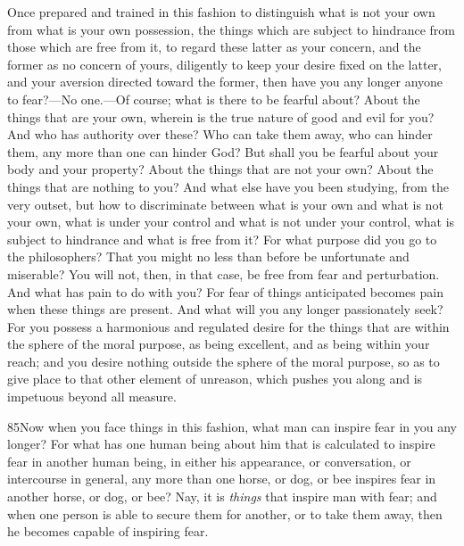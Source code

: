 Once prepared and trained in this fashion to distinguish what is not your own from what is your own possession, the things which are subject to hindrance from those which are free from it, to regard these latter as your concern, and the former as no concern of yours, diligently to keep your desire fixed on the latter, and your aversion directed toward the former, then have you any longer anyone to fear?—No one.—Of course; what is there to be fearful about? About the things that are your own, wherein is the true nature of good and evil for you? And who has authority over these? Who can take them away, who can hinder them, any more than one can hinder God? But shall you be fearful about your body and your property? About the things that are not your own? About the things that are nothing to you? And what else have you been studying, from the very outset, but how to discriminate between what is your own and what is not your own, what is under your control and what is not under your control, what is subject to hindrance and what is free from it? For what purpose did you go to the philosophers? That you might no less than before be unfortunate and miserable? You will not, then, in that case, be free from fear and perturbation. And what has pain to do with you? For fear of things anticipated becomes pain when these things are present. And what will you any longer passionately seek? For you possess a harmonious and regulated desire for the things that are within the sphere of the moral purpose, as being excellent, and as being within your reach; and you desire nothing outside the sphere of the moral purpose, so as to give place to that other element of unreason, which pushes you along and is impetuous beyond all measure.

85Now when you face things in this fashion, what man can inspire fear in you any longer? For what has one human being about him that is calculated to inspire fear in another human being, in either his appearance, or conversation, or intercourse in general, any more than one horse, or dog, or bee inspires fear in another horse, or dog, or bee? Nay, it is \emph{things} that inspire man with fear; and when one person is able to secure them for another, or to take them away, then he becomes capable of inspiring fear.

